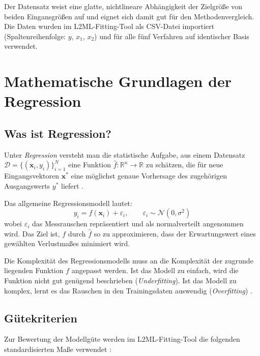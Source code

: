 \documentclass[11pt,a4paper]{report}
\begin{document}
Der Datensatz weist eine glatte, nichtlineare Abh\"{a}ngigkeit der Zielgr\"{o}\ss{}e von beiden
Eingansgr\"{o}\ss{}en auf und eignet sich damit gut f\"{u}r den Methodenvergleich. Die Daten wurden
im L2ML-Fitting-Tool als CSV-Datei importiert (Spaltenreihenfolge: $y$, $x_1$, $x_2$) und f\"{u}r alle
f\"{u}nf Verfahren auf identischer Basis verwendet.

\chapter{Mathematische Grundlagen der Regression}

\section{Was ist Regression?}

Unter \emph{Regression} versteht man die statistische Aufgabe, aus einem Datensatz
$\mathcal{D} = \{(\mathbf{x}_i, y_i)\}_{i=1}^N$ eine Funktion
$\hat{f}: \mathbb{R}^n \to \mathbb{R}$ zu sch\"{a}tzen, die f\"{u}r neue Eingangsvektoren
$\mathbf{x}^*$ eine m\"{o}glichst genaue Vorhersage des zugeh\"{o}rigen Ausgangswerts $y^*$
liefert \cite{bishop2006}.

Das allgemeine Regressionsmodell lautet:
\begin{equation}
y_i = f(\mathbf{x}_i) + \varepsilon_i, \qquad \varepsilon_i \sim \mathcal{N}(0, \sigma^2)
\label{eq:regression_model}
\end{equation}
wobei $\varepsilon_i$ das Messrauschen repr\"{a}sentiert und als normalverteilt angenommen wird.
Das Ziel ist, $f$ durch $\hat{f}$ so zu approximieren, dass der Erwartungswert eines gew\"{a}hlten
Verlustma\ss{}es minimiert wird.

Die Komplexit\"{a}t des Regressionsmodells muss an die Komplexit\"{a}t der zugrunde liegenden
Funktion $f$ angepasst werden. Ist das Modell zu einfach, wird die Funktion nicht gut
gen\"{u}gend beschrieben (\emph{Underfitting}). Ist das Modell zu komplex, lernt es das Rauschen
in den Trainingsdaten auswendig (\emph{Overfitting}) \cite{hastie2009}.

\section{G\"{u}tekriterien}
\label{sec:guetekriterien}

Zur Bewertung der Modellg\"{u}te werden im L2ML-Fitting-Tool die folgenden standardisierten Ma\ss{}e
verwendet \cite{hastie2009,bishop2006}:
\end{document}
